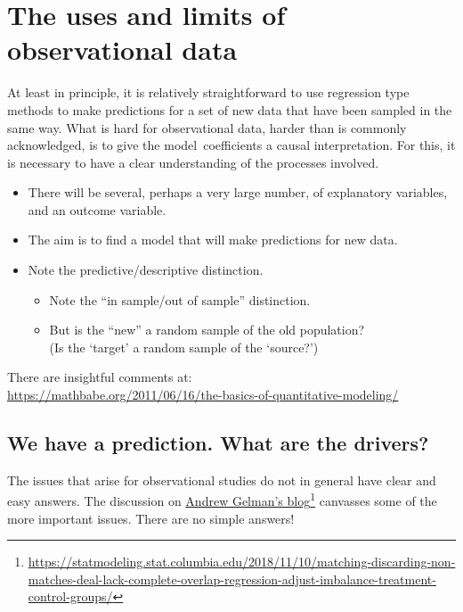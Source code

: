 \documentclass[
  10pt,
  b5paper]{book}
\providecommand{\tightlist}{%
  \setlength{\itemsep}{0pt}\setlength{\parskip}{0pt}}
\begin{document}
\hypertarget{the-uses-and-limits-of-observational-data}{%
\chapter{The uses and limits of observational data}\label{the-uses-and-limits-of-observational-data}}

At least in principle, it is relatively straightforward to use
regression type methods to make predictions for a set of new
data that have been sampled in the same way. What is hard for
observational data, harder than is commonly acknowledged,
is to give the model~coefficients a causal interpretation.
For this, it is necessary to have a clear understanding of the
processes involved.

\begin{itemize}
\tightlist
\item
  There will be several, perhaps a very large number,
  of explanatory variables, and an outcome variable.
\item
  The aim is to find a model that will make predictions for new data.
\item
  Note the predictive/descriptive distinction.

  \begin{itemize}
  \tightlist
  \item
    Note the ``in sample/out of sample'' distinction.
  \item
    But is the ``new'' a random sample of the old population?\\
    (Is the `target' a random sample of the `source?')
  \end{itemize}
\end{itemize}

There are insightful comments at:\\
\url{https://mathbabe.org/2011/06/16/the-basics-of-quantitative-modeling/}

\hypertarget{we-have-a-prediction.-what-are-the-drivers}{%
\section{We have a prediction. What are the drivers?}\label{we-have-a-prediction.-what-are-the-drivers}}

The issues that arise for observational studies do not in general have
clear and easy answers. The discussion on
\href{https://statmodeling.stat.columbia.edu/2018/11/10/matching-discarding-non-matches-deal-lack-complete-overlap-regression-adjust-imbalance-treatment-control-groups/}{Andrew Gelman's blog}\footnote{\url{https://statmodeling.stat.columbia.edu/2018/11/10/matching-discarding-non-matches-deal-lack-complete-overlap-regression-adjust-imbalance-treatment-control-groups/}} canvasses some of the more important issues. There are no simple answers!
\end{document}
